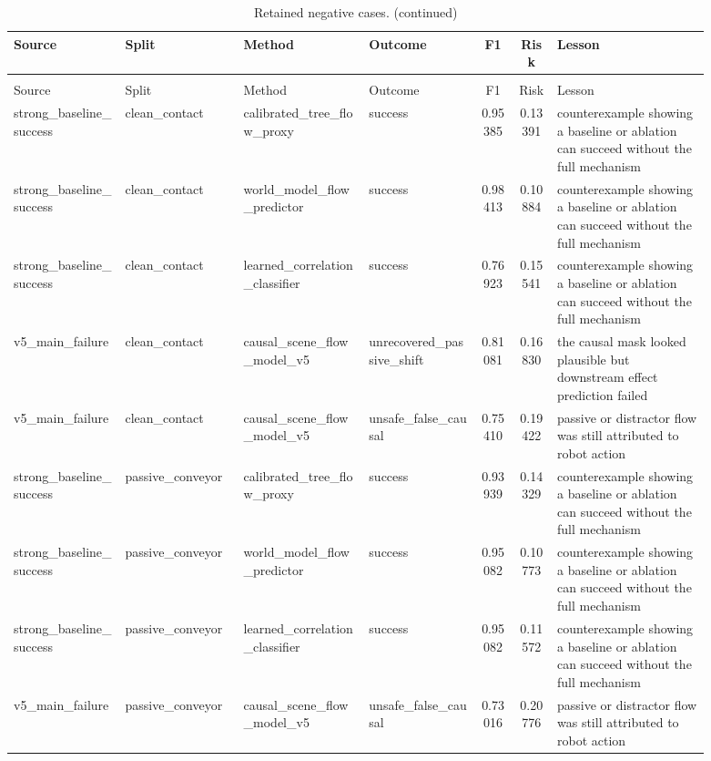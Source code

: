 \documentclass{article}
\begin{document}
\begin{center}
\scriptsize
\begin{longtable}{p{0.16\linewidth}p{0.17\linewidth}p{0.18\linewidth}p{0.16\linewidth}ccp{0.22\linewidth}}
\caption{Retained negative cases.}\label{tab:negative-cases}\\
\toprule
Source & Split & Method & Outcome & F1 & Risk & Lesson\\
\midrule
\endfirsthead
\caption[]{Retained negative cases. (continued)}\\
\toprule
Source & Split & Method & Outcome & F1 & Risk & Lesson\\
\midrule
\endhead
strong\_baseline\_success & clean\_contact & calibrated\_tree\_flow\_proxy & success & 0.95385 & 0.13391 & counterexample showing a baseline or ablation can succeed without the full mechanism\\
strong\_baseline\_success & clean\_contact & world\_model\_flow\_predictor & success & 0.98413 & 0.10884 & counterexample showing a baseline or ablation can succeed without the full mechanism\\
strong\_baseline\_success & clean\_contact & learned\_correlation\_classifier & success & 0.76923 & 0.15541 & counterexample showing a baseline or ablation can succeed without the full mechanism\\
v5\_main\_failure & clean\_contact & causal\_scene\_flow\_model\_v5 & unrecovered\_passive\_shift & 0.81081 & 0.16830 & the causal mask looked plausible but downstream effect prediction failed\\
v5\_main\_failure & clean\_contact & causal\_scene\_flow\_model\_v5 & unsafe\_false\_causal & 0.75410 & 0.19422 & passive or distractor flow was still attributed to robot action\\
strong\_baseline\_success & passive\_conveyor & calibrated\_tree\_flow\_proxy & success & 0.93939 & 0.14329 & counterexample showing a baseline or ablation can succeed without the full mechanism\\
strong\_baseline\_success & passive\_conveyor & world\_model\_flow\_predictor & success & 0.95082 & 0.10773 & counterexample showing a baseline or ablation can succeed without the full mechanism\\
strong\_baseline\_success & passive\_conveyor & learned\_correlation\_classifier & success & 0.95082 & 0.11572 & counterexample showing a baseline or ablation can succeed without the full mechanism\\
v5\_main\_failure & passive\_conveyor & causal\_scene\_flow\_model\_v5 & unsafe\_false\_causal & 0.73016 & 0.20776 & passive or distractor flow was still attributed to robot action\\

\end{longtable}
\end{center}
\end{document}

